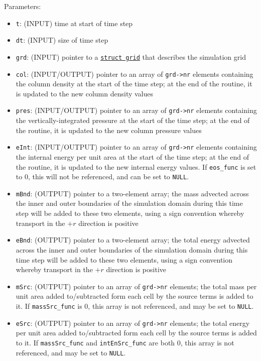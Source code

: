 \documentclass[12pt]{article}
\begin{document}
Parameters:
\begin{itemize}
\item \texttt{t}: (INPUT) time at start of time step
\item \texttt{dt}: (INPUT) size of time step
\item \texttt{grd}: (INPUT) pointer to a \hyperref[sssec:datastructures]{\texttt{struct grid}} that describes the simulation grid
\item \texttt{col}: (INPUT/OUTPUT) pointer to an array of \texttt{grd->nr} elements containing the column density at the start of the time step; at the end of the routine, it is updated to the new column density values
\item \texttt{pres}: (INPUT/OUTPUT) pointer to an array of \texttt{grd->nr} elements containing the vertically-integrated pressure at the start of the time step; at the end of the routine, it is updated to the new column pressure values
\item \texttt{eInt}: (INPUT/OUTPUT) pointer to an array of \texttt{grd->nr} elements containing the internal energy per unit area at the start of the time step; at the end of the routine, it is updated to the new internal energy values. If \verb=eos_func= is set to 0, this will not be referenced, and can be set to \texttt{NULL}.
\item \texttt{mBnd}: (OUTPUT) pointer to a two-element array; the mass advected across the inner and outer boundaries of the simulation domain during this time step will be added to these two elements, using a sign convention whereby transport in the $+r$ direction is positive
\item \texttt{eBnd}: (OUTPUT) pointer to a two-element array; the total energy advected across the inner and outer boundaries of the simulation domain during this time step will be added to these two elements, using a sign convention whereby transport in the $+r$ direction is positive
\item \texttt{mSrc}: (OUTPUT) pointer to an array of \texttt{grd->nr} elements; the total mass per unit area added to/subtracted form each cell by the source terms is added to it. If \verb=massSrc_func= is 0, this array is not referenced, and may be set to \texttt{NULL}.
\item \texttt{eSrc}: (OUTPUT) pointer to an array of \texttt{grd->nr} elements; the total energy per unit area added to/subtracted form each cell by the source terms is added to it. If \verb=massSrc_func= and \verb=intEnSrc_func= are both 0, this array is not referenced, and may be set to \texttt{NULL}.

\end{itemize}
\end{document}

